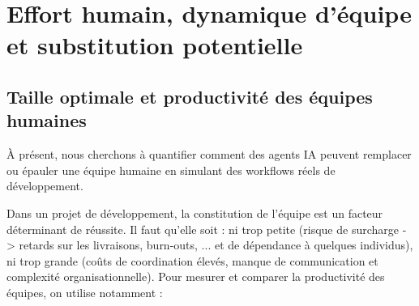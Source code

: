 \chapter{Effort humain, dynamique d’équipe et substitution potentielle} \label{chapitre:humainAgent}

\section{Taille optimale et productivité des équipes humaines}

À présent, nous cherchons à quantifier comment des agents IA peuvent remplacer ou épauler une équipe humaine en simulant des workflows réels de développement.

Dans un projet de développement, la constitution de l’équipe est un facteur déterminant de réussite. Il faut qu'elle soit : ni trop petite (risque de surcharge -> retards sur les livraisons, burn-outs, ... et de dépendance à quelques individus), ni trop grande (coûts de coordination élevés, manque de communication et complexité organisationnelle). Pour mesurer et comparer la productivité des équipes, on utilise notamment :

